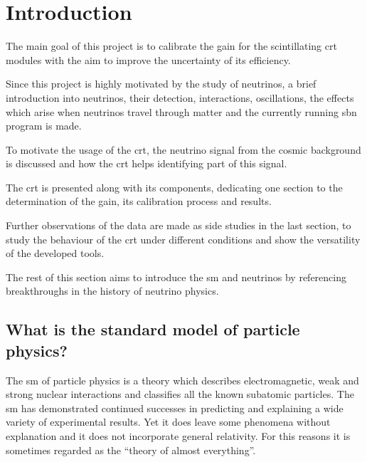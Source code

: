 \section{Introduction}

The main goal of this project is to calibrate the gain for the scintillating \gls{crt} modules with the aim to improve the uncertainty of its efficiency.

Since this project is highly motivated by the study of neutrinos, a brief introduction into neutrinos, their detection, interactions, oscillations, the effects which arise when neutrinos travel through matter and the currently running \gls{sbn} program is made.

To motivate the usage of the \gls{crt}, the neutrino signal from the cosmic background is discussed and how the \gls{crt} helps identifying part of this signal.

The \gls{crt} is presented along with its components, dedicating one section to the determination of the gain, its calibration process and results.

Further observations of the data are made as side studies in the last section, to study the behaviour of the \gls{crt} under different conditions and show the versatility of the developed tools.

The rest of this section  aims to introduce the \gls{sm} and neutrinos by referencing breakthroughs in the history of neutrino physics.

\pagebreak

\subsection{What is the standard model of particle physics?}

The \gls{sm} of particle physics is a theory which describes electromagnetic, weak and strong nuclear interactions and classifies all the known subatomic particles.
The \gls{sm} has demonstrated continued successes in predicting and explaining a wide variety of experimental results\cite{Herrero:1998eq}.
Yet it does leave some phenomena without explanation and it does not incorporate general relativity.
For this reasons it is sometimes regarded as the ``theory of almost everything''.

